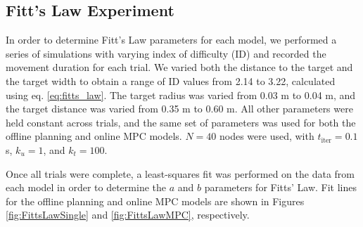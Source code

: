 \documentclass[letterpaper, 10pt, conference]{ieeeconf}
\newcommand{\todo}[1]{\textcolor{red}{\textbf{TODO:} #1}}
\begin{document}

\subsection{Fitt's Law Experiment}


In order to determine Fitt's Law parameters for each model, we performed a series of simulations with varying index of difficulty (ID) and recorded the movement duration for each trial.
We varied both the distance to the target and the target width to obtain a range of ID values from 2.14 to 3.22, calculated using eq. \ref{eq:fitts_law}.
The target radius was varied from 0.03 m to 0.04 m, and the target distance was varied from 0.35 m to 0.60 m.
All other parameters were held constant across trials, and the same set of parameters was used for both the offline planning and online MPC models.
$N = 40$ nodes were used, with $t_{\text{iter}} = 0.1$ s, $k_u = 1$, and $k_t = 100$. 

Once all trials were complete, a least-squares fit was performed on the data from each model in order to determine the $a$ and $b$ parameters for Fitts' Law. Fit lines for the offline planning and online MPC models are shown in Figures \ref{fig:FittsLawSingle} and \ref{fig:FittsLawMPC}, respectively.   
\end{document}
